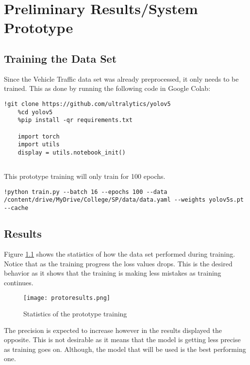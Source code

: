 \chapter{Preliminary Results/System Prototype}

\section{Training the Data Set}

Since the Vehicle Traffic data set was already preprocessed, it only needs to be trained. This as done by running the following code in Google Colab:

\begin{lstlisting}[frame=single]
	!git clone https://github.com/ultralytics/yolov5
	%cd yolov5
	%pip install -qr requirements.txt
	
	import torch
	import utils
	display = utils.notebook_init()
	
\end{lstlisting}

This prototype training will only train for 100 epochs.

\begin{lstlisting}[frame=single]
		!python train.py --batch 16 --epochs 100 --data /content/drive/MyDrive/College/SP/data/data.yaml --weights yolov5s.pt --cache
\end{lstlisting}

\newpage


\section{Results}

Figure \ref{fig:protores} shows the statistics of how the data set performed during training. Notice that as the training progress the loss values drops. This is the desired behavior as it shows that the training is making less mistakes as training continues.

\begin{figure}[h!]
	\texttt{[image: protoresults.png]}
	\caption{Statistics of the prototype training}
	\label{fig:protores}
\end{figure}

The precision is expected to increase however in the results displayed the opposite. This is not desirable as it means that the model is getting less precise as training goes on. Although, the model that will be used is the best performing one.

